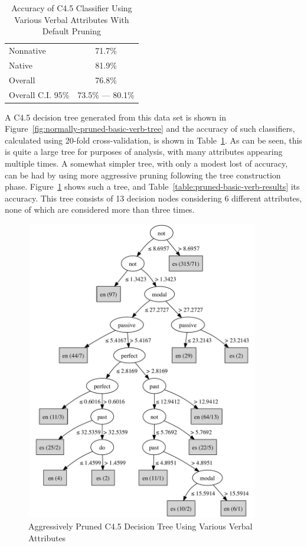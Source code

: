 \documentclass[main.tex]{subfiles}
\begin{document}
\begin{table}[htbp]
\centering
\caption{Accuracy of C4.5 Classifier Using Various Verbal Attributes With Default Pruning}
\begin{tabular}{l c}
\toprule
Nonnative & 71.7\% \\
Native & 81.9\% \\
Overall & 76.8\% \\
Overall C.I. 95\% & 73.5\% --- 80.1\%\\
\bottomrule
\end{tabular}
\label{table:normally-pruned-basic-verb-results}
\end{table}

A C4.5 decision tree generated from this data set is shown in Figure~\ref{fig:normally-pruned-basic-verb-tree} and the accuracy of such classifiers, calculated using 20-fold cross-validation, is shown in Table~\ref{table:normally-pruned-basic-verb-results}. As can be seen, this is quite a large tree for purposes of analysis, with many attributes appearing multiple times. A somewhat simpler tree, with only a modest lost of accuracy, can be had by using more aggressive pruning following the tree construction phase. Figure~\ref{fig:pruned-basic-verb-tree} shows such a tree, and Table~\ref{table:pruned-basic-verb-results} its accuracy. This tree consists of 13 decision nodes considering 6 different attributes, none of which are considered more than three times.
\begin{figure}[htbp]
\centering
\includegraphics[width=4in]{pruned-basic-verb-tree.pdf}
\caption{Aggressively Pruned C4.5 Decision Tree Using Various Verbal Attributes}
\label{fig:pruned-basic-verb-tree}
\end{figure}
\end{document}
